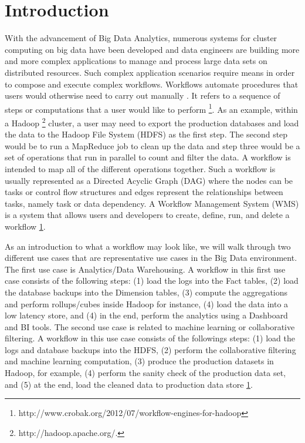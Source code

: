 \chapter{Introduction}
With the advancement of Big Data Analytics, numerous systems for cluster computing on big data have been developed \cite{zaharia2012resilient,battre2010nephele,thusoo2010hive,dean2008mapreduce,yu2008dryadlinq,olston2008pig} and data engineers are building more and more complex applications to manage and process large data sets on distributed resources. Such complex application scenarios require means in order to compose and execute complex workflows. Workflows automate procedures that users would otherwise need to carry out manually \cite{deelman2009workflows}. It refers to a sequence of steps or computations that a user would like to perform 
\footnote{\label{crobak}http://www.crobak.org/2012/07/workflow-engines-for-hadoop}. As an example, within a Hadoop \footnote{\label{hadoop}http://hadoop.apache.org/.} cluster, a user may need to export the production databases and load the data to the Hadoop File System (HDFS) as the first step. The second step would be to run a MapReduce job to clean up the data and step three would be a set of operations that run in parallel to count and filter the data. A workflow is intended to map all of the different operations together. Such a workflow is usually represented as a Directed Acyclic Graph (DAG) where the nodes can be tasks or control flow structures and edges represent the relationships between tasks, namely task or data dependency. A Workflow Management System (WMS) is a system that allows users and developers to create, define, run, and delete a workflow \cref{crobak}. 
	
As an introduction to what a workflow may look like, we will walk through two different use cases that are representative use cases in the Big Data environment. The first use case is Analytics/Data Warehousing. A workflow in this first use case consists of the following steps: (1) load the logs into the Fact tables, (2) load the database backups into the Dimension tables, (3) compute the aggregations and perform rollups/cubes inside Hadoop for instance, (4) load the data into a low latency store, and (4) in the end, perform the analytics using a Dashboard and BI tools. The second use case is related to machine learning or collaborative filtering. A workflow in this use case consists of the followings steps: (1) load the logs and database backups into the HDFS, (2) perform the collaborative filtering and machine learning computation, (3) produce the production datasets in Hadoop, for example, (4) perform the sanity check of the production data set, and (5) at the end, load the cleaned data to production data store \cref{crobak}.

